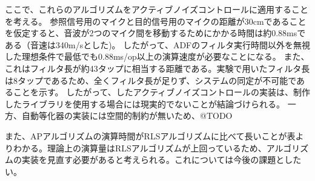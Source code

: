 ここで、これらのアルゴリズムをアクティブノイズコントロールに適用することを考える。
参照信号用のマイクと目的信号用のマイクの距離が30cmであることを仮定すると、音波が2つのマイク間を移動するためにかかる時間は約0.88msである（音速は340m/sとした)。
したがって、ADFのフィルタ実行時間以外を無視した理想条件で最低でも0.88ms/op以上の演算速度が必要なことになる。
また、これはフィルタ長が約43タップに相当する距離である。実験で用いたフィルタ長は8タップであるため、全くフィルタ長が足りず、システムの同定が不可能であることを示す。
したがって、したアクティブノイズコントロールの実装は、制作したライブラリを使用する場合には現実的でないことが結論づけられる。
一方、自動等化器の実装には空間的制約が無いため、@TODO

また、APアルゴリズムの演算時間がRLSアルゴリズムに比べて長いことが表よりわかる。理論上の演算量はRLSアルゴリズムが上回っているため、アルゴリズムの実装を見直す必要があると考えられる。これについては今後の課題としたい。
